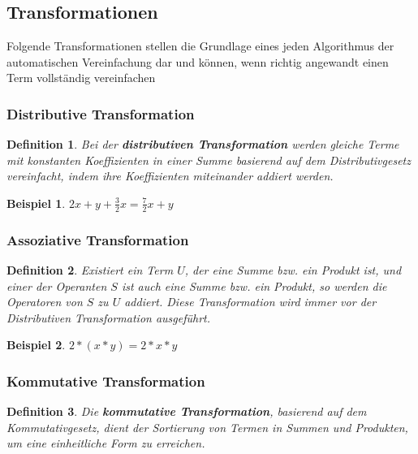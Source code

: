\documentclass[11pt]{article}
\newtheorem{defin}{Definition}
\newtheorem{example}{Beispiel}
\begin{document}
\subsection{Transformationen}

Folgende Transformationen stellen die Grundlage eines jeden Algorithmus der automatischen Vereinfachung dar und können,
wenn richtig angewandt einen Term vollständig vereinfachen

\subsubsection{Distributive Transformation}

\begin{defin}
  \label{def:distributive_transformation}
  Bei der \textbf{distributiven Transformation} werden gleiche Terme mit konstanten Koeffizienten
  in einer Summe basierend auf dem Distributivgesetz vereinfacht, 
  indem ihre Koeffizienten miteinander addiert werden. 
\end{defin}

\begin{example}
  $2x + y + \frac{3}{2}x = \frac{7}{2}x + y$
\end{example}

\subsubsection{Assoziative Transformation}

\begin{defin}
  \label{def:assoziative_transformation}
  Existiert ein Term $U$, der eine Summe bzw. ein Produkt ist, und einer der Operanten $S$ ist auch eine Summe 
  bzw. ein Produkt, so werden die Operatoren von $S$ zu $U$ addiert. 
  Diese Transformation wird immer vor der Distributiven Transformation ausgeführt.
\end{defin}

\begin{example}
  $2*(x*y) = 2*x*y$
\end{example}

\subsubsection{Kommutative Transformation}

\begin{defin}
  \label{def:kommutative_transformation}
  Die \textbf{kommutative Transformation}, 
  basierend auf dem Kommutativgesetz, dient der Sortierung von Termen in Summen und Produkten, 
  um eine einheitliche Form zu erreichen.
\end{defin}
\end{document}
